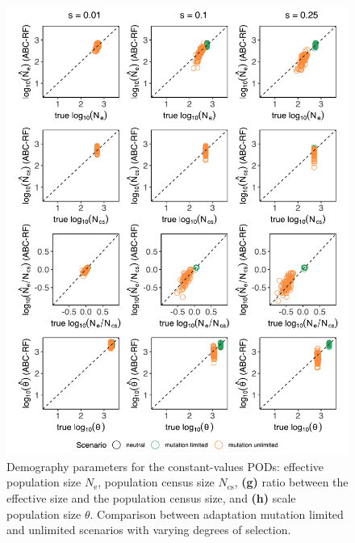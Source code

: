 \documentclass[a4paper, 12pt]{article}
\begin{document}
\begin{figure}[!htb]
  \centering
  \label{fig:fig4}
  \includegraphics[width=1\textwidth]{Figures/pred_plots_ggplot2_fixed_demog_2.pdf}
  \captionsetup{font=footnotesize}
  \caption{Demography parameters for the constant-values PODs: effective population size $N_{\mathrm{e}}$, population census size $N_{\mathrm{cs}}$, \textbf{(g)} ratio between the effective size and the population census size, and \textbf{(h)} scale population size $\theta$. Comparison between adaptation mutation limited and unlimited scenarios with varying degrees of selection.}
\end{figure}
\end{document}
